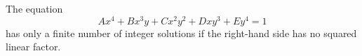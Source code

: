 \begin{proposition}
    The equation
\[
    Ax^4+Bx^3y+Cx^2y^2+Dxy^3+Ey^4=1
\]
    has only a finite number of integer solutions if the right-hand side has no squared linear factor.
\end{proposition}
